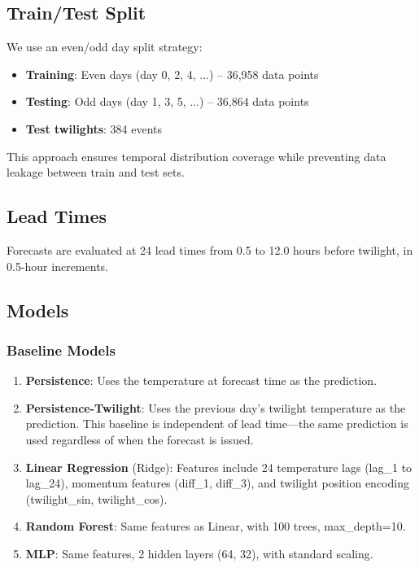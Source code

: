 \documentclass[11pt]{article}
\begin{document}
\subsection{Train/Test Split}
We use an even/odd day split strategy:
\begin{itemize}
    \item \textbf{Training}: Even days (day 0, 2, 4, ...) -- 36,958 data points
    \item \textbf{Testing}: Odd days (day 1, 3, 5, ...) -- 36,864 data points
    \item \textbf{Test twilights}: 384 events
\end{itemize}
This approach ensures temporal distribution coverage while preventing data leakage between train and test sets.

\subsection{Lead Times}
Forecasts are evaluated at 24 lead times from 0.5 to 12.0 hours before twilight, in 0.5-hour increments.

\subsection{Models}

\subsubsection{Baseline Models}
\begin{enumerate}
    \item \textbf{Persistence}: Uses the temperature at forecast time as the prediction.
    \item \textbf{Persistence-Twilight}: Uses the previous day's twilight temperature as the prediction. This baseline is independent of lead time---the same prediction is used regardless of when the forecast is issued.
    \item \textbf{Linear Regression} (Ridge): Features include 24 temperature lags (lag\_1 to lag\_24), momentum features (diff\_1, diff\_3), and twilight position encoding (twilight\_sin, twilight\_cos).
    \item \textbf{Random Forest}: Same features as Linear, with 100 trees, max\_depth=10.
    \item \textbf{MLP}: Same features, 2 hidden layers (64, 32), with standard scaling.
\end{enumerate}
\end{document}
